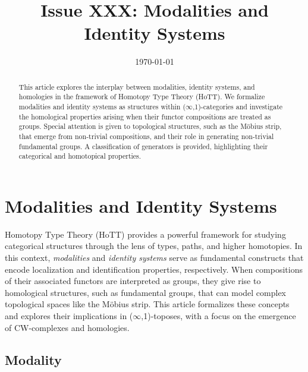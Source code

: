 \documentclass[12pt]{article}
\theoremstyle{definition}
\theoremstyle{plain}
\begin{document}
\title{Issue XXX: Modalities and Identity Systems}
\author{}
\date{\today}

\maketitle

\begin{abstract}
This article explores the interplay between modalities, identity systems, and homologies
in the framework of Homotopy Type Theory (HoTT). We formalize modalities and identity
systems as structures within ($\infty$,1)-categories and investigate the homological properties arising when their functor compositions are treated as groups. Special attention is given to topological structures, such as the Möbius strip, that emerge from non-trivial compositions, and their role in generating non-trivial fundamental groups. A classification of generators is provided, highlighting their categorical and homotopical properties.
\end{abstract}

\section{Modalities and Identity Systems}

Homotopy Type Theory (HoTT) provides a powerful framework for studying
categorical structures through the lens of types, paths, and higher
homotopies. In this context, \emph{modalities} and \emph{identity systems}
serve as fundamental constructs that encode localization and identification
properties, respectively. When compositions of their associated functors
are interpreted as groups, they give rise to homological structures, such
as fundamental groups, that can model complex topological spaces like the
Möbius strip. This article formalizes these concepts and explores their
implications in ($\infty$,1)-toposes, with a focus on the emergence of CW-complexes and homologies.

\newpage
\subsection{Modality}
\end{document}
